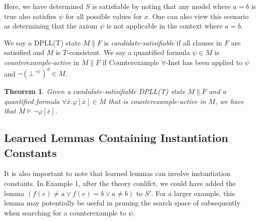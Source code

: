 \documentclass{llncs}
\newtheorem{thm}{Theorem}
\begin{document}
Here, we have determined $S$ is satisfiable by noting that any model where $a = b$ is true also satisfies $\psi$ for all possible values for $x$.
One can also view this scenario as determining that the axiom $\psi$ is not applicable in the context where $a = b$.

We say a DPLL(T) state $M \parallel F$ is \emph{candidate-satisifiable} if all clauses in $F$ are satisified and $M$ is $T$-consistent.
We say a quantified formula $\psi \in M$ is \emph{counterexample-active} in $M \parallel F$ if Counterexample $\forall$-Inst has been applied to $\psi$ and $\neg (\bot^{\neg \psi})^d \in M$.

\begin{thm}
\label{thm:cerep}
Given a candidate-satisifiable DPLL(T) state $M \parallel F$ and a quantified formula $\forall \bar{x}. \varphi[ \bar{x} ] \in M$ that is counterexample-active in $M$, we have that $M \models \neg \varphi[\bar{e}]$.
\end{thm}

\subsection{Learned Lemmas Containing Instantiation Constants}

It is also important to note that learned lemmas can involve instantiation constants.
In Example 1, after the theory conlifct, we could have added the lemma $( f( e ) \neq a \vee f( e ) = b \vee a \neq b )$ to $S'$.
For a larger example, this lemma may potentially be useful in pruning the search space of subsequently when searching for a counterexample to $\psi$.

\begin{comment}
It is also important to note that learned lemmas can involve instantiation constants.
In this example, after the theory conlifct, we could have added the lemma $(\varphi_1 : ) ( f( e ) \neq a \vee f( e ) = b \vee a \neq b )$ to $S'$.
In this case, we may apply Decide to come to the state $( a = b ), \psi, (\bot^{\neg \psi}), (f( e ) \neq a)^d \parallel S' \cup \varphi$, where again all clauses are satisfied, and the solver answers SAT in the same manner.

However, note that the lemma $\varphi_1$ is only useful in contexts in which $\psi$ is asserted.
In other words, the solver should not be searching for values of counterexamples to quantified formulas $\psi$ when $\psi$ is not asserted.
We will see in Section~\ref{sec:implementation} a recommended implementation for which this concern is addressed.
[do this: do these lemmas pollute the DPLL(T) space?  When should we forget them?  Should we give them to minisat?]
[do this: examine elaborating lemmas involving instantiation constants as being lemmas involving universal statements, justify as well]
\end{comment}
\end{document}
